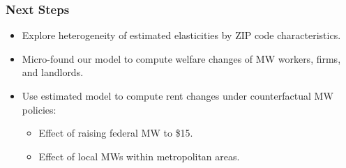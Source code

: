 \begin{frame}
	\frametitle{Next Steps}
	\begin{itemize}
		\item Explore heterogeneity of estimated elasticities by ZIP code 
		characteristics.
		
	    \vspace{3mm} \item Micro-found our model to compute welfare changes of MW 
	    workers, firms, and landlords.
	    
	    \vspace{3mm} \item Use estimated model to compute rent changes under 
	    counterfactual MW policies:
	    \vspace{.5mm}
	    \begin{itemize}
	    	\item Effect of raising federal MW to \$15.
	    	\item Effect of local MWs within metropolitan areas.
	    \end{itemize}	    
	    
\end{itemize}

	
\end{frame}